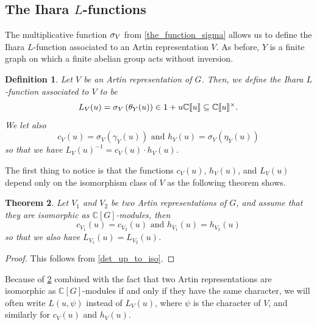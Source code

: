 \documentclass[11pt]{amsart}
\newtheorem{theorem}{Theorem}[section]
\newtheorem{definition}[theorem]{Definition}
\numberwithin{equation}{section}
\theoremstyle{remark}
\theoremstyle{definition}
\begin{document}
\subsection{The Ihara \texorpdfstring{$L$}{L}-functions} \label{iharalfun}
The multiplicative function ${\rm \sigma}_{V}$ from \cref{the_function_sigma} allows us to define the Ihara $L$-function associated to an Artin representation $V$.  As before, $Y$ is a finite graph on which a finite abelian group acts without inversion.
\begin{definition}
Let $V$ be an Artin representation of $G$.  Then, we define the Ihara $L$-function associated to $V$ to be
$$L_{V}(u) = {\rm \sigma}_{V}\left(\theta_{Y}(u) \right) \in 1 + u \mathbb{C}\llbracket u \rrbracket \subseteq \mathbb{C} \llbracket u \rrbracket^{\times}.$$
We let also
$$c_{V}(u) = \sigma_{V}(\gamma_{Y}(u)) \text{ and } h_{V}(u) = \sigma_{V}(\eta_{Y}(u)) $$
so that we have $L_{V}(u)^{-1} = c_{V}(u) \cdot h_{V}(u)$.
\end{definition}
The first thing to notice is that the functions $c_{V}(u)$, $h_{V}(u)$, and $L_{V}(u)$ depend only on the isomorphism class of $V$ as the following theorem shows.
\begin{theorem} \label{dep}
Let $V_{1}$ and $V_{2}$ be two Artin representations of $G$, and assume that they are isomorphic as $\mathbb{C}[G]$-modules, then
$$c_{V_{1}}(u) = c_{V_{2}}(u) \text{ and } h_{V_{1}}(u) = h_{V_{2}}(u) $$
so that we also have $L_{V_{1}}(u) = L_{V_{2}}(u)$.
\end{theorem}
\begin{proof}
This follows from \cref{det_up_to_iso}.
\end{proof}
Because of \cref{dep} combined with the fact that two Artin representations are isomorphic as $\mathbb{C}[G]$-modules if and only if they have the same character, we will often write $L(u,\psi)$ instead of $L_{V}(u)$, where $\psi$ is the character of $V$, and similarly for $c_{V}(u)$ and $h_{V}(u)$.
\end{document}
